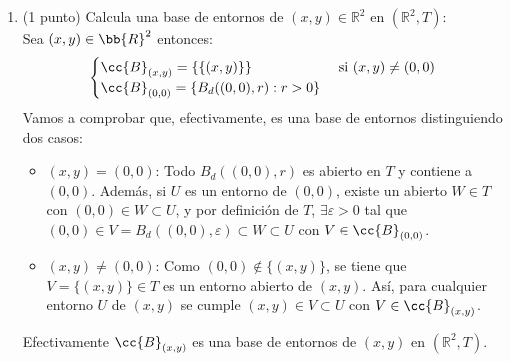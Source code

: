 \documentclass[12pt]{article}
\begin{document}
\begin{ejercicio}
\begin{enumerate}
\begin{enumerate}
\begin{itemize}
            \end{itemize}
        \end{enumerate}
        Además es claro que $T_u\leq T$. Comprobémoslo de la siguiente manera: sea $B_1 = B_d((x,y), r)\in B_u$ con $(x,y) \in B_1$, $r>0$ entonces:
        \begin{itemize}
            \item Si $(x,y) = (0,0)$ entonces está claro que existe un $B_d((0,0), r') \in T$ con $r>r'>0$ tal que $(x,y)\in B_d((0,0), r') \subset B_d((0,0), r)$
            \item Si $(x,y) \neq (0,0)$ entonces para $d((x,y),(0,0)) > \epsilon > 0$ y $r > \epsilon$ se tiene $(0,0)\notin B_d((x,y), \epsilon) \Rightarrow B_d((x,y), \epsilon) \in T$ y por lo tanto $(x,y)\in B_d((x,y), \epsilon) \subset B_d((x,y), r)$
        \end{itemize}
        Por inclusión de las bases, $T_u\leq T$. Pero la otra implicación no es cierta, pues por ejemplo$\overline{B_d}((0,0), 1) \in T$ pero $\overline{B_d}((0,0), 1)\notin T_u$.
        
        \item (1 punto) Calcula una base de entornos de $(x,y) \in \mathbb{R}^2$ en $(\mathbb{R}^2, T)$:\\
        Sea $(x,y)\in\bb{R}^2$ entonces:
        \[\begin{cases}
            \cc{B}_{(x,y)} = \{\{(x,y)\}\} & \text{ si }(x,y)\neq (0,0)\\
            \cc{B}_{(0,0)} = \{B_d((0,0), r) : r > 0\}
        \end{cases}\]
        Vamos a comprobar que, efectivamente, es una base de entornos distinguiendo dos casos:
        \begin{itemize}
            \item $(x,y) = (0,0)$: Todo $B_d((0,0), r)$ es abierto en $T$ y contiene a $(0,0)$. Además, si $U$ es un entorno de $(0,0)$, existe un abierto $W\in T$ con $(0,0)\in W\subset U$, y por definición de $T$, $\exists \varepsilon > 0$ tal que $(0,0)\in V = B_d((0,0), \varepsilon) \subset W \subset U$ con $V\in\cc{B}_{(0,0)}$.
            \item $(x,y) \neq (0,0)$: Como $(0,0)\notin \{(x,y)\}$, se tiene que $V = \{(x,y)\}\in T$ es un entorno abierto de $(x,y)$. Así, para cualquier entorno $U$ de $(x,y)$ se cumple $(x,y)\in V\subset U$ con $V\in\cc{B}_{(x,y)}$.
        \end{itemize}
        Efectivamente $\cc{B}_{(x,y)}$ es una base de entornos de $(x,y)$ en $(\mathbb{R}^2, T)$.


\end{enumerate}
\end{ejercicio}
\end{document}
